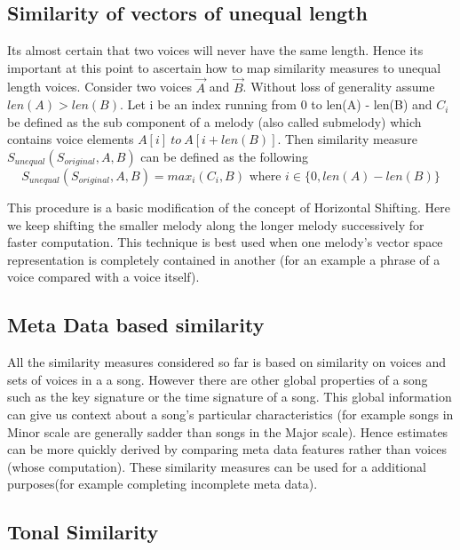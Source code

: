 \subsection{Similarity of vectors of unequal length} \label{sim:unequal}

\noindent Its almost certain that two voices will  never have the same length. Hence its important at this point to ascertain how to map similarity measures to unequal length voices. Consider two voices $\vec{A}$ and $\vec{B}$. Without loss of generality assume $len(A) > len(B)$. Let i be an index running from 0 to len(A) - len(B) and $C_i$ be defined as the sub component of a melody (also called submelody) which contains voice elements $A[i] \ to \ A[i + len(B)]$. Then similarity measure $S_{unequal}(S_{original}, A, B)$ can be defined as the following
\begin{equation}
S_{unequal}(S_{original}, A, B) = max_i (C_i, B) \text{ where } i \in \{0, len(A) - len(B)\}
\end{equation}

\noindent This procedure is a basic modification of the concept of Horizontal Shifting\cite{similietechnicalmanual}. Here we keep shifting the smaller melody along the longer melody successively for faster computation. This technique is best used when one melody's vector space representation is completely contained in another (for an example a phrase of a voice compared with a voice itself).

\subsection{Meta Data based similarity}

\noindent All the similarity measures considered so far is based on similarity on voices and sets of voices in a a song. However there are other global properties of a song such as the key signature or the time signature of a song. This global information can give us context about a song's particular characteristics (for example songs in Minor scale are generally sadder than songs in the Major scale). Hence estimates can be more quickly derived by comparing meta data features rather than voices (whose computation). These similarity measures can be used for a additional purposes(for example completing incomplete meta data). 

\subsection{Tonal Similarity}


